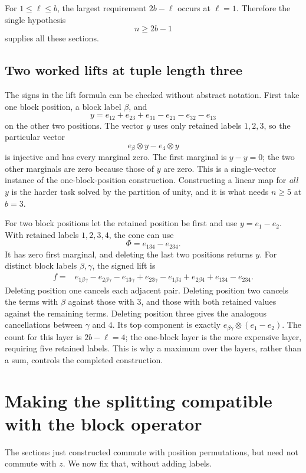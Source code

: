 For $1\le \ell\le b$, the largest requirement $2b-\ell$ occurs at $\ell=1$. Therefore the single hypothesis
\begin{equation}\label{tx:eq:linearlabel}n\ge2b-1\end{equation}
supplies all these sections.

\subsection{Two worked lifts at tuple length three}
The signs in the lift formula can be checked without abstract
notation. First take one block position, a block label $\beta$, and
\[
 y=e_{12}+e_{23}+e_{31}-e_{21}-e_{32}-e_{13}
\]
on the other two positions. The vector $y$ uses only retained labels
$1,2,3$, so the particular vector
\[
                    e_\beta\otimes y-e_4\otimes y
\]
is injective and has every marginal zero. The first marginal is
$y-y=0$; the two other marginals are zero because those of $y$ are
zero. This is a single-vector instance of the one-block-position
construction. Constructing a linear map for \emph{all} $y$ is the
harder task solved by the partition of unity, and it is what needs
$n\ge5$ at $b=3$.

For two block positions let the retained position be first and use
$y=e_1-e_2$. With retained labels $1,2,3,4$, the cone can use
\[
                         \Phi=e_{134}-e_{234}.
\]
It has zero first marginal, and deleting the last two positions
returns $y$. For distinct block labels $\beta,\gamma$, the signed
lift is
\begin{align*}
 f={}&e_{1\beta\gamma}-e_{2\beta\gamma}
       -e_{13\gamma}+e_{23\gamma}
       -e_{1\beta4}+e_{2\beta4}
       +e_{134}-e_{234}.
\end{align*}
Deleting position one cancels each adjacent pair. Deleting position
two cancels the terms with $\beta$ against those with $3$, and
those with both retained values against the remaining terms.
Deleting position three gives the analogous cancellations between
$\gamma$ and $4$. Its top component is exactly
$e_{\beta\gamma}\otimes(e_1-e_2)$. The count for this layer is
$2b-\ell=4$; the one-block layer is the more expensive layer, requiring
five retained labels. This is why a maximum over the layers, rather
than a sum, controls the completed construction.

\section{Making the splitting compatible with the block operator}\label{tx:sec:blocksplitting}
The sections just constructed commute with position permutations, but need not commute with $z$. We now fix that, without adding labels.

